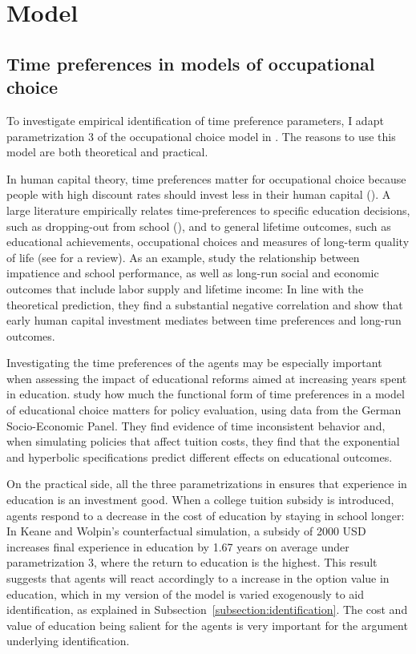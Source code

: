 

\section{Model} \label{simulation}

\subsection{Time preferences in models of occupational choice}

To investigate empirical identification of time preference parameters, I adapt parametrization 3 of the occupational choice model in \textcite{KeaneWolpin1994}. The reasons to use this model are both theoretical and practical.

In human capital theory, time preferences matter for occupational choice because people with high discount rates should invest less in their human capital (\cite{Mincer1958}). A large literature empirically relates time-preferences to specific education decisions, such as dropping-out from school (\cite{Oreopoulos2007}), and to general lifetime outcomes, such as educational achievements, occupational choices and measures of long-term quality of life (see \cite{Koch2015} for a review). As an example, \textcite{Lindahl2014} study the relationship between impatience and school performance, as well as long-run social and economic outcomes that include labor supply and lifetime income: In line with the theoretical prediction, they find a substantial negative correlation and show that early human capital investment mediates between time preferences and long-run outcomes.

Investigating the time preferences of the agents may be especially important when assessing the impact of educational reforms aimed at increasing years spent in education. \textcite{KempterTolan2018} study how much the functional form of time preferences in a model of educational choice matters for policy evaluation, using data from the German Socio-Economic Panel. They find evidence of time inconsistent behavior and, when simulating policies that affect tuition costs, they find that the exponential and hyperbolic specifications predict different effects on educational outcomes. 

On the practical side, all the three parametrizations in \textcite{KeaneWolpin1994} ensures that experience in education is an investment good. When a college tuition subsidy is introduced, agents respond to a decrease in the cost of education by staying in school longer: In Keane and Wolpin's counterfactual simulation, a subsidy of 2000 USD increases final experience in education by 1.67 years on average under parametrization 3, where the return to education is the highest. This result suggests that agents will react accordingly to a increase in the option value in education, which in my version of the model is varied exogenously to aid identification, as explained in Subsection~\ref{subsection:identification}. The cost and value of education being salient for the agents is very important for the argument underlying identification. 


